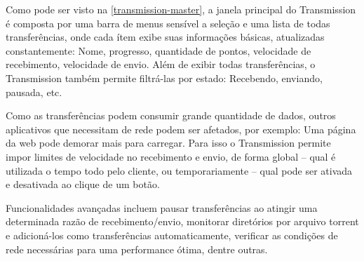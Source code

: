 Como pode ser visto na \autoref{transmission-master}, a janela principal do
Transmission é composta por uma barra de menus sensível a seleção e uma lista de
todas transferências, onde cada ítem exibe suas informações básicas, atualizadas
constantemente: Nome, progresso, quantidade de pontos, velocidade de
recebimento, velocidade de envio. Além de exibir todas transferências, o
Transmission também permite filtrá-las por estado: Recebendo, enviando, pausada,
etc.

Como as transferências podem consumir grande quantidade de dados, outros
aplicativos que necessitam de rede podem ser afetados, por exemplo: Uma página
da web pode demorar mais para carregar. Para isso o Transmission permite impor
limites de velocidade no recebimento e envio, de forma global -- qual é
utilizada o tempo todo pelo cliente, ou temporariamente -- qual pode ser ativada
e desativada ao clique de um botão.

Funcionalidades avançadas incluem pausar transferências ao atingir uma
determinada razão de recebimento/envio, monitorar diretórios por arquivo torrent
e adicioná-los como transferências automaticamente, verificar as condições de
rede necessárias para uma performance ótima, dentre outras.
